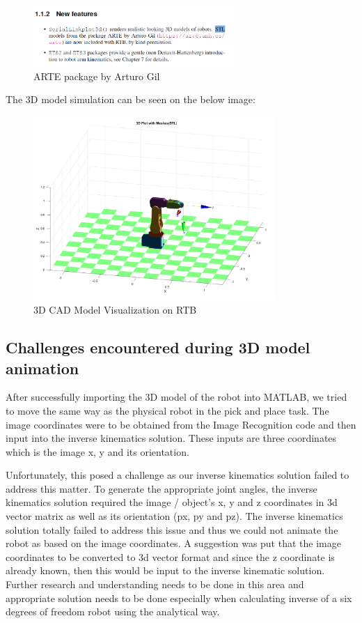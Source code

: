 \begin{figure}[H]
  \centering
  \includegraphics[width=3.0in ]{pics/Screenshot_7.png}
  \caption{ARTE package by Arturo Gil \cite{RoboticsToolbox}}
  \label{arte}
\end{figure}


The 3D model simulation can be seen on the below image:


\begin{figure}[H]
  \centering
  \includegraphics[width=3.6in ]{pics/3d stl.png}
  \caption{3D CAD Model Visualization on RTB}
  \label{3d}
\end{figure}



\subsection{Challenges encountered during 3D model animation}
After successfully importing the 3D model of the robot into MATLAB, we tried to
move the same way as the physical robot in the pick and place task. The image
coordinates were to be obtained from the Image Recognition code and then input
into the inverse kinematics solution. These inputs are three coordinates which is
the image x, y and its orientation. 

\noindent Unfortunately, this posed a challenge as our inverse kinematics solution failed to address this 
matter. To generate the appropriate joint angles, the inverse kinematics solution
required the image / object's x, y and z coordinates in 3d vector matrix as well
as its orientation (px, py and pz). The inverse kinematics solution totally failed
to address this issue and thus we could not animate the robot as based on the 
image coordinates. A suggestion was put that the image coordinates to be converted
to 3d vector format and since the z coordinate is already known, then this would 
be input to the inverse kinematic solution. Further research and understanding needs to be done in 
this area and appropriate solution needs to be done especially when calculating 
inverse of a six degrees of freedom robot using the analytical way. 





